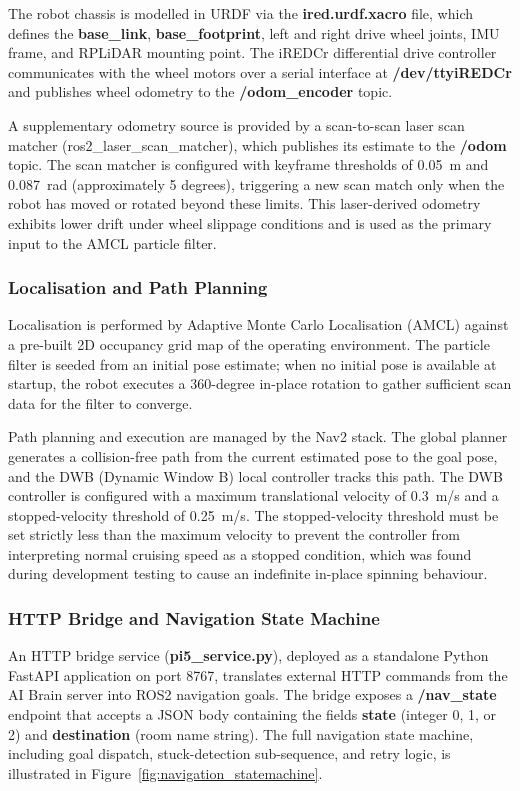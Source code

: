 The robot chassis is modelled in URDF via the \textbf{ired.urdf.xacro} file, which defines the \textbf{base\_link}, \textbf{base\_footprint}, left and right drive wheel joints, IMU frame, and RPLiDAR mounting point. The iREDCr differential drive controller communicates with the wheel motors over a serial interface at \textbf{/dev/ttyiREDCr} and publishes wheel odometry to the \textbf{/odom\_encoder} topic.

A supplementary odometry source is provided by a scan-to-scan laser scan matcher (ros2\_laser\_scan\_matcher), which publishes its estimate to the \textbf{/odom} topic. The scan matcher is configured with keyframe thresholds of 0.05~m and 0.087~rad (approximately 5 degrees), triggering a new scan match only when the robot has moved or rotated beyond these limits. This laser-derived odometry exhibits lower drift under wheel slippage conditions and is used as the primary input to the AMCL particle filter.

\subsubsection{Localisation and Path Planning}

Localisation is performed by Adaptive Monte Carlo Localisation (AMCL) against a pre-built 2D occupancy grid map of the operating environment. The particle filter is seeded from an initial pose estimate; when no initial pose is available at startup, the robot executes a 360-degree in-place rotation to gather sufficient scan data for the filter to converge.

Path planning and execution are managed by the Nav2 stack. The global planner generates a collision-free path from the current estimated pose to the goal pose, and the DWB (Dynamic Window B) local controller tracks this path. The DWB controller is configured with a maximum translational velocity of 0.3~m/s and a stopped-velocity threshold of 0.25~m/s. The stopped-velocity threshold must be set strictly less than the maximum velocity to prevent the controller from interpreting normal cruising speed as a stopped condition, which was found during development testing to cause an indefinite in-place spinning behaviour.

\subsubsection{HTTP Bridge and Navigation State Machine}

An HTTP bridge service (\textbf{pi5\_service.py}), deployed as a standalone Python FastAPI application on port 8767, translates external HTTP commands from the AI Brain server into ROS2 navigation goals. The bridge exposes a \textbf{/nav\_state} endpoint that accepts a JSON body containing the fields \textbf{state} (integer 0, 1, or 2) and \textbf{destination} (room name string). The full navigation state machine, including goal dispatch, stuck-detection sub-sequence, and retry logic, is illustrated in Figure~\ref{fig:navigation_statemachine}.



